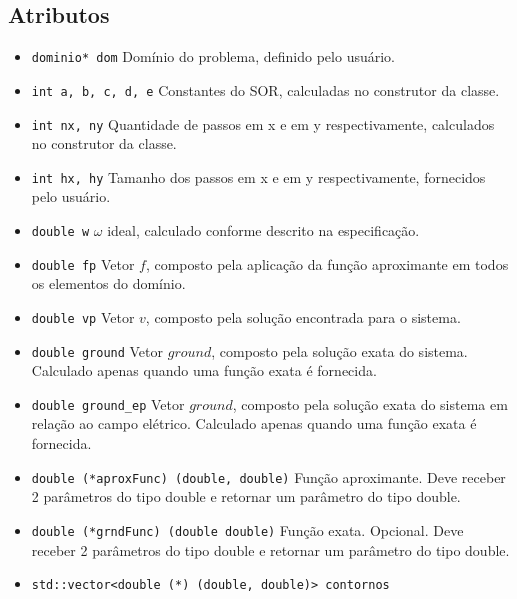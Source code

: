 \documentclass[oneside]{abntex2}
\begin{document}
\subsection{Atributos}
\begin{itemize}
    \item \texttt{dominio* dom} \newline
        Domínio do problema, definido pelo usuário.
    \item \texttt{int a, b, c, d, e} \newline
        Constantes do SOR, calculadas no construtor da classe.
    \item \texttt{int nx, ny} \newline
        Quantidade de passos em x e em y respectivamente, calculados no construtor da classe.
    \item \texttt{int hx, hy} \newline
        Tamanho dos passos em x e em y respectivamente, fornecidos pelo usuário.
    \item \texttt{double w}
        $\omega$ ideal, calculado conforme descrito na especificação.
    \item \texttt{double fp} \newline
        Vetor $f$, composto pela aplicação da função aproximante em todos os elementos do domínio.
    \item \texttt{double vp} \newline
        Vetor $v$, composto pela solução encontrada para o sistema.
    \item \texttt{double ground} \newline
        Vetor $ground$, composto pela solução exata do sistema. Calculado apenas quando uma função exata é fornecida.
    \item \texttt{double ground\_ep} \newline
        Vetor $ground$, composto pela solução exata do sistema em relação ao campo elétrico. Calculado apenas quando uma função exata é fornecida.
    \item \texttt{double (*aproxFunc) (double, double)} \newline
        Função aproximante. Deve receber 2 parâmetros do tipo double e retornar um parâmetro do tipo double.
    \item \texttt{double (*grndFunc) (double double)} \newline
        Função exata. Opcional. Deve receber 2 parâmetros do tipo double e retornar um parâmetro do tipo double.
    \item \texttt{std::vector<double (*) (double, double)> contornos} \newline

\end{itemize}
\end{document}
